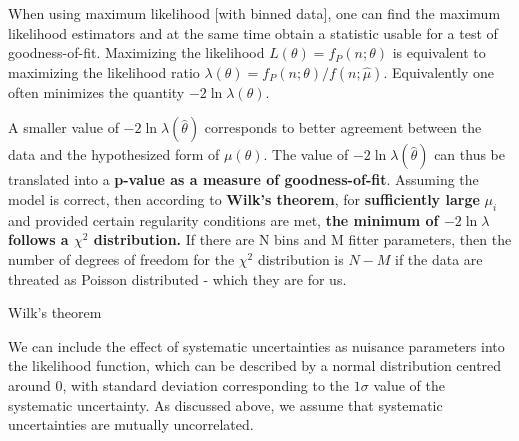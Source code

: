 When using maximum likelihood [with binned data], one can find the maximum likelihood estimators and at the same time obtain a statistic usable for a test of goodness-of-fit. Maximizing the likelihood $L\left(\theta\right)=f_P\left(n;\theta\right)$ is equivalent to maximizing the likelihood ratio $\lambda\left(\theta\right)=f_P\left(n;\theta\right) / f\left(n;\hat{\mu}\right)$. Equivalently one often minimizes the quantity $-2\ln\lambda\left(\theta\right)$. \cite{PDG.pdf}

A smaller value of $-2\ln\lambda\left(\hat{\theta}\right)$ corresponds to better agreement between the data and the hypothesized form of $\mu\left(\theta\right)$. The value of $-2\ln\lambda\left(\hat{\theta}\right)$ can thus be translated into a \textbf{p-value as a measure of goodness-of-fit}. Assuming the model is correct, then according to \textbf{Wilk's theorem}, for \textbf{sufficiently large} $\mu_i$ and provided certain regularity conditions are met, \textbf{the minimum of $-2\ln\lambda$ follows a $\chi^2$ distribution.} If there are N bins and M fitter parameters, then the number of degrees of freedom for the $\chi^2$ distribution is $N-M$ if the data are threated as Poisson distributed - which they are for us.

Wilk's theorem \cite{WilksTheorem1938.pdf}



We can include the effect of systematic uncertainties as nuisance parameters into the likelihood function, which can be described by a normal distribution centred around $0$, with standard deviation corresponding to the $1\sigma$ value of the systematic uncertainty. As discussed above, we assume that systematic uncertainties are mutually uncorrelated.

